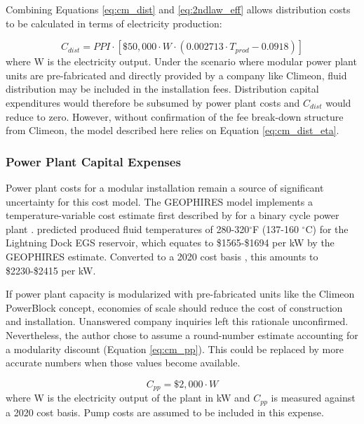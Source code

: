 Combining Equations \ref{eq:cm_dist} and \ref{eq:2ndlaw_eff} allows distribution costs to be calculated in terms of electricity production:

\begin{equation}
\label{eq:cm_dist_eta}
    C_{dist} = PPI \cdot \left[ \$50,000 \cdot W \cdot (0.002713 \cdot T_{prod} - 0.0918) \right]
\end{equation}
where W is the electricity output. Under the scenario where modular power plant units are pre-fabricated and directly provided by a company like Climeon, fluid distribution may be included in the installation fees. Distribution capital expenditures would therefore be subsumed by power plant costs and $C_{dist}$ would reduce to zero. However, without confirmation of the fee break-down structure from Climeon, the model described here relies on Equation \ref{eq:cm_dist_eta}. 

\subsubsection{Power Plant Capital Expenses}\label{ch4:cm_capex_pp}
Power plant costs for a modular installation remain a source of significant uncertainty for this cost model. The GEOPHIRES model implements a temperature-variable cost estimate first described by \citet{tester_future_2006} for a binary cycle power plant \citep{beckers_introducing_2013}. \citet{schochet_development_2001} predicted produced fluid temperatures of 280-320$^\circ$F (137-160 $^\circ$C) for the Lightning Dock EGS reservoir, which equates to \$1565-\$1694 per kW by the GEOPHIRES estimate. Converted to a 2020 cost basis \citep{us_bls_ppi_2021}, this amounts to \$2230-\$2415 per kW.

If power plant capacity is modularized with pre-fabricated units like the Climeon PowerBlock concept, economies of scale should reduce the cost of construction and installation. Unanswered company inquiries left this rationale unconfirmed. Nevertheless, the author chose to assume a round-number estimate accounting for a modularity discount (Equation \ref{eq:cm_pp}). This could be replaced by more accurate numbers when those values become available.

\begin{equation}
\label{eq:cm_pp}
    C_{pp} = \$2,000 \cdot W
\end{equation}
where W is the electricity output of the plant in kW and $C_{pp}$ is measured against a 2020 cost basis. Pump costs are assumed to be included in this expense.

